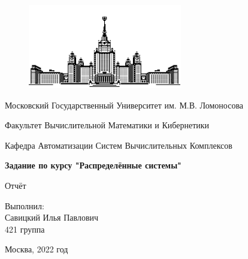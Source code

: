 \documentclass[12pt]{article}
\begin{document}
\begin{titlepage}
    \thispagestyle{empty}

    \begin{center}
        \begin{figure}[htbp]
            \centering
            \includegraphics[width=0.6\textwidth]{msu.png}
        \end{figure}

        Московский Государственный Университет им. М.В. Ломоносова

        Факультет Вычислительной Математики и Кибернетики

        Кафедра Автоматизации Систем Вычислительных Комплексов

        \vfill
        \textbf{\huge Задание по курсу "Распределённые системы"}

        {\huge Отчёт}
    \end{center}

    \vfill
    \begin{flushright}
        {\large Выполнил:\\Савицкий Илья Павлович\\421 группа\\}
    \end{flushright}

    \centerline{Москва, 2022 год}

\end{titlepage}
\linespread{1.7}
\setcounter{page}{2}
\large
\newpage



\end{document}
